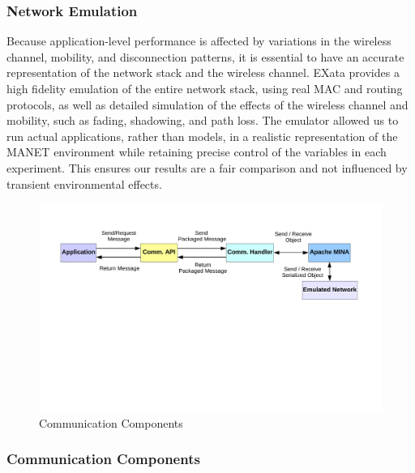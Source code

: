 \documentclass[lnicst]{svmultln}
\begin{document}
\subsubsection{Network Emulation}

Because application-level performance is affected by variations in the wireless channel, mobility, and disconnection patterns, it is essential to have an accurate representation of the network stack and the wireless channel\cite{fidelity1,fidelity2}. EXata provides a high fidelity emulation of the entire network stack, using real MAC and routing protocols, as well as detailed simulation of the effects of the wireless channel and mobility, such as fading, shadowing, and path loss\cite{exata}. The emulator allowed us to run actual applications, rather than models, in a realistic representation of the MANET environment while retaining precise control of the variables in each experiment. This ensures our results are a fair comparison and not influenced by transient environmental effects.


\begin{figure}
\centering
\includegraphics[width=\textwidth, clip, trim = 62px 325px 72px 80px]{figures/comm_comp.pdf}
\caption{Communication Components}
\label{fig:components}
\end{figure}

\subsubsection{Communication Components}
\end{document}
